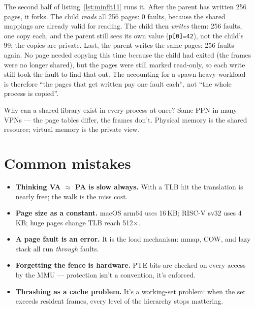 \begin{example}
The second half of listing~\ref{lst:minflt11} runs it. After the parent has
written 256 pages, it forks. The child \emph{reads} all 256 pages:
0 faults, because the shared mappings are already valid for reading.
The child then \emph{writes} them: 256 faults, one copy each, and
the parent still sees its own value (\texttt{p[0]=42}), not the child's 99:
the copies are private. Last, the parent writes the same pages: 256
faults again. No page needed copying this time because the child had
exited (the frames were no longer shared), but the pages were still marked
read-only, so each write still took the fault to find that out. The
accounting for a spawn-heavy workload is therefore ``the pages that
get written pay one fault each'', not ``the whole process is copied''.
\end{example}




\begin{checkpoint}
Why can a shared library exist in every process at once? Same PPN
in many VPNs --- the page tables differ, the frames don't. Physical
memory is the shared resource; virtual memory is the private view.
\end{checkpoint}

\section{Common mistakes}
\label{sec:mistakes11}
\begin{itemize}
\item \textbf{Thinking VA $\approx$ PA is slow always.} With a TLB
      hit the translation is nearly free; the walk is the miss cost.
\item \textbf{Page size as a constant.} macOS arm64 uses 16\,KB;
      RISC-V sv32 uses 4\,KB; huge pages change TLB reach 512$\times$.
\item \textbf{A page fault is an error.} It is the load mechanism:
      mmap, COW, and lazy stack all run \emph{through} faults.
\item \textbf{Forgetting the fence is hardware.} PTE bits are
      checked on every access by the MMU --- protection isn't a
      convention, it's enforced.
\item \textbf{Thrashing as a cache problem.} It's a working-set
      problem: when the set exceeds resident frames, every level of
      the hierarchy stops mattering.
\end{itemize}

